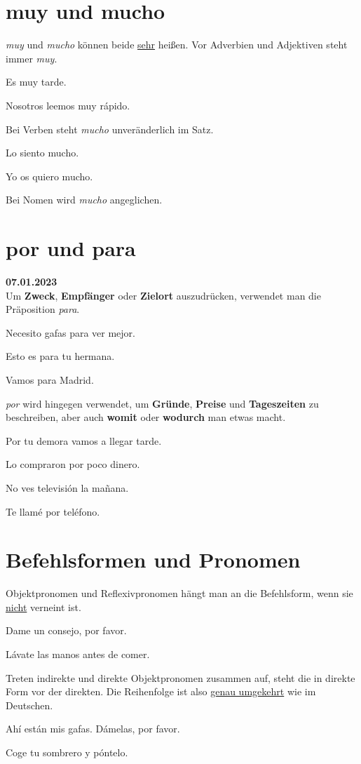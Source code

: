 \section{muy und mucho}
\textit{muy} und \textit{mucho} können beide \underline{sehr} 
heißen. Vor Adverbien und Adjektiven steht immer \textit{muy}.
\begin{ejemplos}
    \item Es muy tarde.
    \item Nosotros leemos muy r\'apido.
\end{ejemplos}
Bei Verben steht \textit{mucho} unveränderlich im Satz.
\begin{ejemplos}
    \item Lo siento mucho.
    \item Yo os quiero mucho.
\end{ejemplos}
Bei Nomen wird \textit{mucho} angeglichen.
\section{por und para}
\textbf{07.01.2023}\\
Um \textbf{Zweck}, \textbf{Empfänger} oder \textbf{Zielort}
auszudrücken, verwendet man die Präposition \textit{para}.
\begin{ejemplos}
    \item Necesito gafas para ver mejor.
    \item Esto es para tu hermana.
    \item Vamos para Madrid.
\end{ejemplos}
\textit{por} wird hingegen verwendet, um \textbf{Gründe},
\textbf{Preise} und \textbf{Tageszeiten} zu beschreiben, aber auch
\textbf{womit} oder \textbf{wodurch} man etwas macht.
\begin{ejemplos}
    \item Por tu demora vamos a llegar tarde.
    \item Lo compraron por poco dinero.
    \item No ves televisi\'on la ma\~nana.
    \item Te llam\'e por tel\'efono.
\end{ejemplos}
\section{Befehlsformen und Pronomen}
Objektpronomen und Reflexivpronomen hängt man an die Befehlsform,
wenn sie \underline{nicht} verneint ist.
\begin{ejemplos}
    \item Dame un consejo, por favor.
    \item L\'avate las manos antes de comer.
\end{ejemplos}
Treten indirekte und direkte Objektpronomen zusammen auf,
steht die in direkte Form vor der direkten. Die Reihenfolge
ist also \underline{genau umgekehrt} wie im Deutschen.
\begin{ejemplos}
    \item Ah\'i est\'an mis gafas. D\'amelas, por favor.
    \item Coge tu sombrero y p\'ontelo.
\end{ejemplos}
